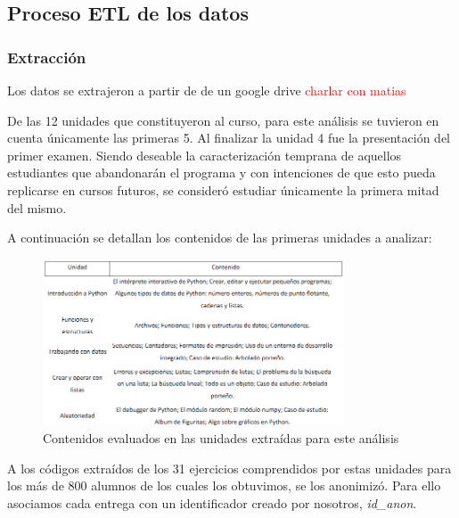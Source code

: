 \documentclass[11pt,a4paper,twoside,openany]{tesis}
\begin{document}
\subsection{Proceso ETL de los datos}

\subsubsection{Extracción}\textbf{ }

Los datos se extrajeron a partir de de un google drive \textcolor{red}{charlar con matias}

De las 12 unidades que constituyeron al curso, para este análisis se tuvieron en cuenta únicamente las primeras 5. Al finalizar la unidad 4 fue la presentación del primer examen. Siendo deseable la caracterización temprana de aquellos estudiantes que abandonarán el programa y con intenciones de que esto pueda replicarse en cursos futuros, se consideró estudiar únicamente la primera mitad del mismo. 

A continuación se detallan los contenidos de las primeras unidades a analizar:

\begin{figure}[H]
    \centering
    \includegraphics[width=0.8\textwidth]{imagenes/modulos-curso.PNG}
    \caption{Contenidos evaluados en las unidades extraídas para este análisis ~\cite{unsam2020}}
\end{figure}

A los códigos extraídos de los 31 ejercicios comprendidos por estas unidades para los más de 800 alumnos de los cuales los obtuvimos, se los anonimizó. Para ello asociamos cada entrega con un identificador creado por nosotros, \emph{id\_anon}.
\end{document}
